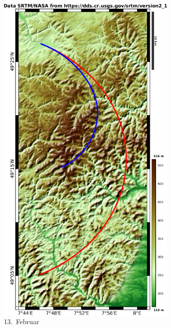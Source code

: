 \documentclass[
    paper=a4,
    DIV14,
    fontsize=12pt,
    pagesize=pdftex,
    toc=bibliographynumbered
]{scrartcl}
\numberwithin{figure}{section}
\numberwithin{equation}{section}
\numberwithin{table}{section}
\begin{document}
\begin{figure}[hbt]
    \centering
    \begin{subfigure}{0.3\textwidth}
        \centering
        \includegraphics[width=0.98\textwidth]{images/elediff/feb13.png}
        \caption{13.\ Februar}
    \end{subfigure}
    \begin{subfigure}{0.685\textwidth}

\end{subfigure}
\end{figure}
\end{document}
